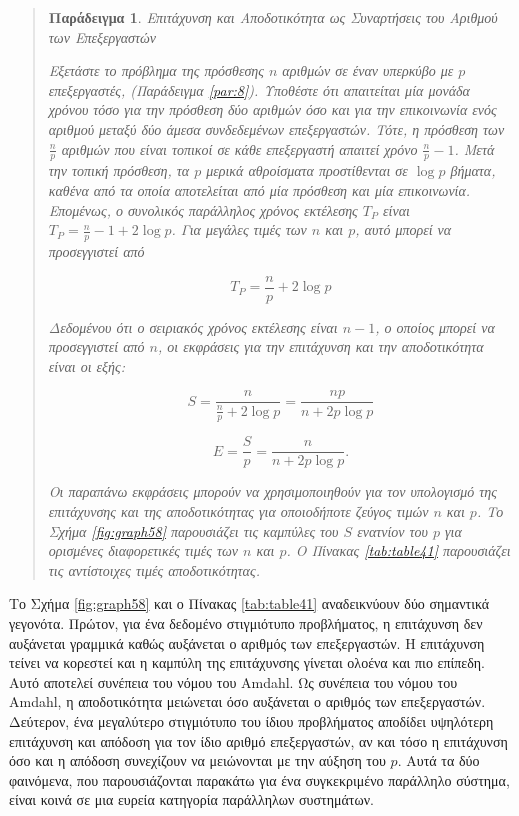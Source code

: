 \documentclass[12pt,a4paper]{article} %
\newtheorem{paradeigma}{Παράδειγμα}
\begin{document}
\begin{quote}
\begin{paradeigma} \label{par:9} Επιτάχυνση και Αποδοτικότητα ως Συναρτήσεις 
του Αριθμού των Επεξεργαστών

Εξετάστε το πρόβλημα της πρόσθεσης $n$ αριθμών σε έναν υπερκύβο με $p$ 
επεξεργαστές, (Παράδειγμα \ref{par:8}). Υποθέστε ότι απαιτείται μία μονάδα 
χρόνου τόσο για την πρόσθεση δύο αριθμών όσο και για την επικοινωνία ενός 
αριθμού μεταξύ δύο άμεσα συνδεδεμένων επεξεργαστών. Τότε, η πρόσθεση των 
$\frac{n}{p}$ αριθμών που είναι τοπικοί σε κάθε επεξεργαστή απαιτεί χρόνο 
$\frac{n}{p}-1$. Μετά την τοπική πρόσθεση, τα $p$ μερικά αθροίσματα 
προστίθενται σε $\log p$ βήματα, καθένα από τα οποία αποτελείται από μία 
πρόσθεση και μία επικοινωνία. Επομένως, ο συνολικός παράλληλος χρόνος 
εκτέλεσης $T_P$ είναι \(T_P=\frac{n}{p}-1+2\log p\). Για μεγάλες τιμές 
των $n$ και $p$, αυτό μπορεί να προσεγγιστεί από

\begin{equation}
T_P = \frac{n}{p} + 2 \log p
\label{eq:relation23}
\end{equation}

Δεδομένου ότι ο σειριακός χρόνος εκτέλεσης είναι $n-1$, ο οποίος μπορεί 
να προσεγγιστεί από $n$, οι εκφράσεις για την επιτάχυνση και την 
αποδοτικότητα είναι οι εξής:

\begin{equation}
S=\frac{n}{\frac{n}{p}+2\log p}
=\frac{np}{n+2p\log p}
\label{eq:relation24}
\end{equation}

\begin{equation}
E=\frac{S}{p}
=\frac{n}{n+2p\log p}.
\label{eq:relation25}
\end{equation}

Οι παραπάνω εκφράσεις μπορούν να χρησιμοποιηθούν για τον υπολογισμό της 
επιτάχυνσης και της αποδοτικότητας για οποιοδήποτε ζεύγος τιμών $n$ και 
$p$. Το Σχήμα \ref{fig:graph58} παρουσιάζει τις καμπύλες του $S$ ενατνίον 
του $p$ για ορισμένες διαφορετικές τιμές των $n$ και $p$. Ο Πίνακας 
\ref{tab:table41} παρουσιάζει τις αντίστοιχες τιμές αποδοτικότητας.
\end{paradeigma}
\end{quote}

Το Σχήμα \ref{fig:graph58} και ο Πίνακας \ref{tab:table41} αναδεικνύουν 
δύο σημαντικά γεγονότα. Πρώτον, για ένα δεδομένο στιγμιότυπο προβλήματος, η 
επιτάχυνση δεν αυξάνεται γραμμικά καθώς αυξάνεται ο αριθμός των επεξεργαστών. 
Η επιτάχυνση τείνει να κορεστεί και η καμπύλη της επιτάχυνσης γίνεται ολοένα 
και πιο επίπεδη. Αυτό αποτελεί συνέπεια του νόμου του Amdahl. 
Ως συνέπεια του νόμου του Amdahl, η 
αποδοτικότητα μειώνεται όσο αυξάνεται ο αριθμός των επεξεργαστών. 
Δεύτερον, ένα μεγαλύτερο στιγμιότυπο του ίδιου προβλήματος αποδίδει
υψηλότερη επιτάχυνση και απόδοση για τον ίδιο αριθμό επεξεργαστών, αν και 
τόσο η επιτάχυνση όσο και η απόδοση συνεχίζουν να μειώνονται με την 
αύξηση του $p$. Αυτά τα δύο φαινόμενα, που παρουσιάζονται παρακάτω για 
ένα συγκεκριμένο παράλληλο σύστημα, είναι κοινά σε μια ευρεία κατηγορία 
παράλληλων συστημάτων.
\end{document}
